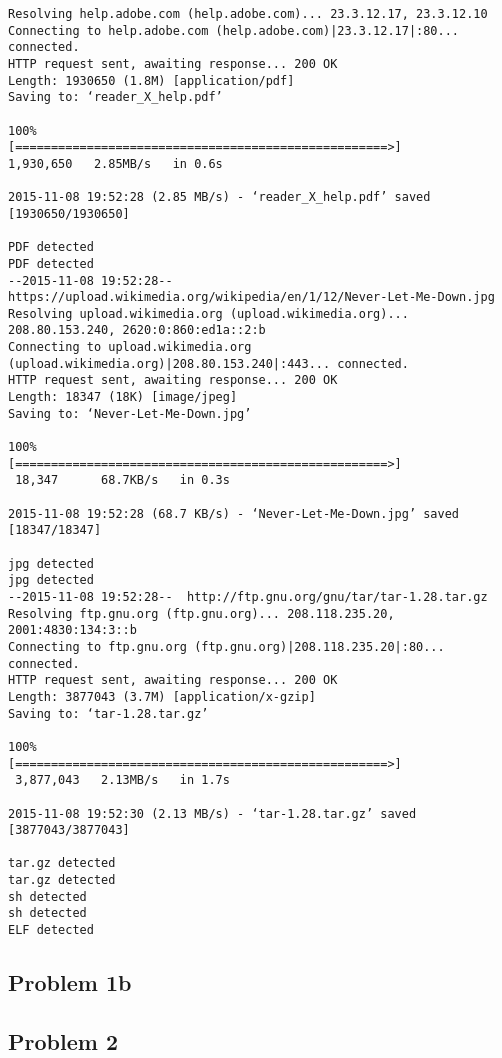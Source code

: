 \documentclass[12pt, a4paper, oneside]{article}
\begin{document}
\begin{lstlisting}
Resolving help.adobe.com (help.adobe.com)... 23.3.12.17, 23.3.12.10
Connecting to help.adobe.com (help.adobe.com)|23.3.12.17|:80... connected.
HTTP request sent, awaiting response... 200 OK
Length: 1930650 (1.8M) [application/pdf]
Saving to: ‘reader_X_help.pdf’

100%
[====================================================>] 
1,930,650   2.85MB/s   in 0.6s   

2015-11-08 19:52:28 (2.85 MB/s) - ‘reader_X_help.pdf’ saved [1930650/1930650]

PDF detected
PDF detected
--2015-11-08 19:52:28--  https://upload.wikimedia.org/wikipedia/en/1/12/Never-Let-Me-Down.jpg
Resolving upload.wikimedia.org (upload.wikimedia.org)... 208.80.153.240, 2620:0:860:ed1a::2:b
Connecting to upload.wikimedia.org (upload.wikimedia.org)|208.80.153.240|:443... connected.
HTTP request sent, awaiting response... 200 OK
Length: 18347 (18K) [image/jpeg]
Saving to: ‘Never-Let-Me-Down.jpg’

100%
[====================================================>]
 18,347      68.7KB/s   in 0.3s   

2015-11-08 19:52:28 (68.7 KB/s) - ‘Never-Let-Me-Down.jpg’ saved [18347/18347]

jpg detected
jpg detected
--2015-11-08 19:52:28--  http://ftp.gnu.org/gnu/tar/tar-1.28.tar.gz
Resolving ftp.gnu.org (ftp.gnu.org)... 208.118.235.20, 2001:4830:134:3::b
Connecting to ftp.gnu.org (ftp.gnu.org)|208.118.235.20|:80... connected.
HTTP request sent, awaiting response... 200 OK
Length: 3877043 (3.7M) [application/x-gzip]
Saving to: ‘tar-1.28.tar.gz’

100%
[====================================================>]
 3,877,043   2.13MB/s   in 1.7s   

2015-11-08 19:52:30 (2.13 MB/s) - ‘tar-1.28.tar.gz’ saved [3877043/3877043]

tar.gz detected
tar.gz detected
sh detected
sh detected
ELF detected
\end{lstlisting}

\subsection*{Problem 1b}

\subsection*{Problem 2}
\end{document}
